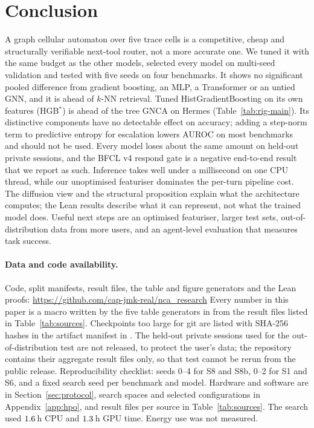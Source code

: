 \documentclass[10pt]{article}
\newcommand{\repolink}{\url{https://github.com/cap-jmk-real/nca_research}}
\newcommand{\repolink}{\textit{Anonymised code, configs and result files for double-blind review: supplementary ZIP \texttt{nca\_tmlr\_supplement\_anon.zip} (rebuilt via \texttt{make -f tmlr/Makefile supplement-zip}; see \texttt{supplement\_README.txt} in the bundle).}}
\begin{document}
\section{Conclusion}\label{sec:conclusion}
A graph cellular automaton over five trace cells is a competitive, cheap and structurally verifiable next-tool router, not a more accurate one. We tuned it with the same budget as the other models, selected every model on multi-seed validation and tested with five seeds on four benchmarks. It shows no significant pooled difference from gradient boosting, an MLP, a Transformer or an untied GNN, and it is ahead of $k$-NN retrieval. Tuned HistGradientBoosting on its own features (HGB$^\ast$) is ahead of the tree GNCA on Hermes (Table~\ref{tab:rig-main}). Its distinctive components have no detectable effect on accuracy; adding a step-norm term to predictive entropy for escalation lowers AUROC on most benchmarks and should not be used. Every model loses about the same amount on held-out private sessions, and the BFCL v4 respond gate is a negative end-to-end result that we report as such. Inference takes well under a millisecond on one CPU thread, while our unoptimised featuriser dominates the per-turn pipeline cost. The diffusion view and the structural proposition explain what the architecture computes; the Lean results describe what it can represent, not what the trained model does. Useful next steps are an optimised featuriser, larger test sets, out-of-distribution data from more users, and an agent-level evaluation that measures task success.

\paragraph{Data and code availability.}\sloppy Code, split manifests, result files, the table and figure generators and the Lean proofs: \repolink{} Every number in this paper is a macro written by the five table generators in  from the result files listed in Table~\ref{tab:sources}. Checkpoints too large for git are listed with SHA-256 hashes in the artifact manifest in . The held-out private sessions used for the out-of-distribution test are not released, to protect the user's data; the repository contains their aggregate result files only, so that test cannot be rerun from the public release. Reproducibility checklist: seeds 0--4 for S8 and S8b, 0--2 for S1 and S6, and a fixed search seed per benchmark and model. Hardware and software are in Section~\ref{sec:protocol}, search spaces and selected configurations in Appendix~\ref{app:hpo}, and result files per source in Table~\ref{tab:sources}. The search used $1.6$\,h CPU and $1.3$\,h GPU time. Energy use was not measured.
\end{document}
